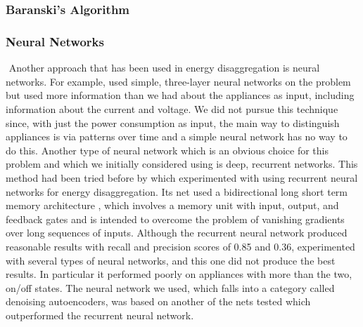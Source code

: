 \documentclass{article}
\begin{document}
​
%
​

​
\subsubsection{Baranski's Algorithm}

\subsubsection{Neural Networks}
​
Another approach that has been used in energy disaggregation is neural networks. For example, \cite{Ruzzelli} used simple, three-layer neural networks on the problem but used more information than we had about the appliances as input, including information about the current and voltage. We did not pursue this technique since, with just the power consumption as input, the main way to distinguish appliances is via patterns over time and a simple neural network has no way to do this. Another type of neural network which is an obvious choice for this problem and which we initially considered using is deep, recurrent networks. This method had been tried  before by \cite{Kelly} which experimented with using recurrent neural networks for energy disaggregation. Its net used a bidirectional long short term memory architecture \cite{Kelly}, which involves a memory unit with input, output, and feedback gates and is intended to overcome the problem of vanishing gradients over long sequences of inputs. Although the recurrent neural network produced reasonable results with recall and precision scores of 0.85 and 0.36, \cite{Kelly} experimented with several types of neural networks, and this one did not produce the best results. In particular it performed poorly on appliances with more than the two, on/off states. The neural network we used, which falls into a category called denoising autoencoders, was based on another of the nets \cite{Kelly} tested which outperformed the recurrent neural network.
\end{document}

